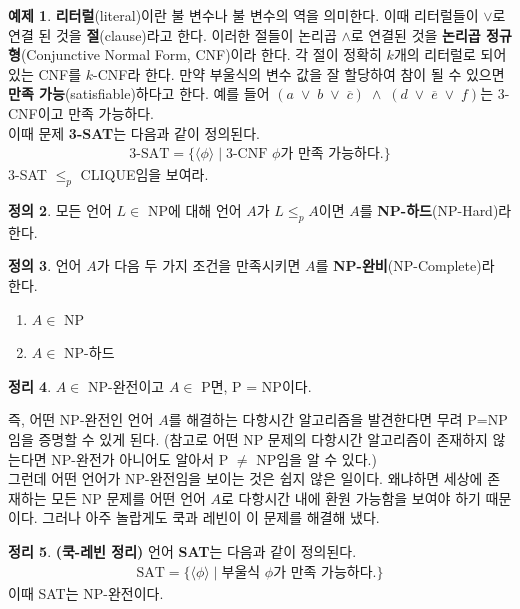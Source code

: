 \documentclass[b5paper, 10pt]{book}
\theoremstyle{definition}
\newtheorem{defn}{정의}[chapter]
\newtheorem{thm}[defn]{정리}
\newtheorem{ex}[defn]{예제}
\begin{document}
\begin{ex}
    \textbf{리터럴}(literal)이란 불 변수나 불 변수의 역을 의미한다. 이때 리터럴들이 $\vee$로 연결 된 것을
    \textbf{절}(clause)라고 한다. 이러한 절들이 논리곱 $\wedge$로 연결된 것을 \textbf{논리곱 
    정규형}(Conjunctive Normal Form, CNF)이라 한다. 각 절이 정확히 $k$개의 리터럴로 되어 있는 CNF를
    $k$-CNF라 한다. 만약 부울식의 변수 값을 잘 할당하여 참이 될 수 있으면 
    \textbf{만족 가능}(satisfiable)하다고 
    한다. 예를 들어 $(a \; \vee\; b \;\vee\; \overline{c} ) \;\wedge\; (d \;\vee\; 
    \overline{e}\; \vee\; f)$는 
    3-CNF이고 만족 가능하다. \\ 
    이때 문제 \textbf{3-SAT}는 다음과 같이 정의된다. 
    \begin{align*}
        \text{3-SAT} = \{\langle \phi \rangle \;\vert\; \text{3-CNF }\phi\text{가 만족 가능하다.} \}
    \end{align*}   
    3-SAT $\le_p$ CLIQUE임을 보여라.
\end{ex}
\begin{defn}
    모든 언어 $L \in$ NP에 대해 언어 $A$가 $L \le_p A$이면 $A$를 \textbf{NP-하드}(NP-Hard)라 한다. 
\end{defn}
\begin{defn}
    언어 $A$가 다음 두 가지 조건을 만족시키면 $A$를 \textbf{NP-완비}(NP-Complete)라 한다.
    \begin{enumerate}
        \item $A \in$ NP
        \item $A \in$ NP-하드
    \end{enumerate}
\end{defn}
\begin{thm}
    $A \in$ NP-완전이고 $A \in$ P면, P = NP이다.
\end{thm}
즉, 어떤 NP-완전인 언어 $A$를 해결하는 다항시간 알고리즘을 발견한다면 
무려 P=NP임을 증명할 수 있게 된다. (참고로 어떤 NP 문제의 다항시간 알고리즘이 존재하지 않는다면 
NP-완전가 아니어도 알아서 P $\neq$ NP임을 알 수 있다.) \\ 
그런데 어떤 언어가 NP-완전임을 보이는 것은 쉽지 않은 일이다. 왜냐하면 세상에 존재하는 
모든 NP 문제를 어떤 언어 $A$로 다항시간 내에 환원 가능함을 보여야 하기 때문이다. 그러나 아주 놀랍게도 
쿡과 레빈이 이 문제를 해결해 냈다.
\begin{thm}
    \label{SAT np-complete}
    \textbf{(쿡-레빈 정리)} 언어 \textbf{SAT}는 다음과 같이 정의된다.
    \begin{align*}
        \text{SAT} = \{\langle \phi \rangle \;\vert\; \text{부울식 } \phi \text{가 만족 가능하다.}\}
    \end{align*} 
    이때 SAT는 NP-완전이다.
\end{thm}
\end{document}
